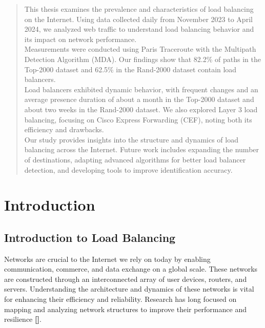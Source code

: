 \documentclass[12pt]{cwru_thesis}
\begin{document}
\printnomenclature

\begin{abstract}
This thesis examines the prevalence and characteristics of load balancing on the Internet. Using data collected daily from November 2023 to April 2024, we analyzed web traffic to understand load balancing behavior and its impact on network performance.\\

Measurements were conducted using Paris Traceroute with the Multipath Detection Algorithm (MDA). Our findings show that 82.2\% of paths in the Top-2000 dataset and 62.5\% in the Rand-2000 dataset contain load balancers.\\

Load balancers exhibited dynamic behavior, with frequent changes and an average presence duration of about a month in the Top-2000 dataset and about two weeks in the Rand-2000 dataset. We also explored Layer 3 load balancing, focusing on Cisco Express Forwarding (CEF), noting both its efficiency and drawbacks.\\

Our study provides insights into the structure and dynamics of load balancing across the Internet. Future work includes expanding the number of destinations, adapting advanced algorithms for better load balancer detection, and developing tools to improve identification accuracy.
\end{abstract}


\mainmatter

\setcounter{secnumdepth}{2}

\chapter{Introduction} 
\label{chap:intro}

\section{Introduction to Load Balancing}

Networks are crucial to the Internet we rely on today by enabling communication, commerce, and data exchange on a global scale. These networks are constructed through an interconnected array of user devices, routers, and servers. Understanding the architecture and dynamics of these networks is vital for enhancing their efficiency and reliability. Research has long focused on mapping and analyzing network structures to improve their performance and resilience \textbf{[\cite{paxson_endtoend96}]}.
\end{document}
